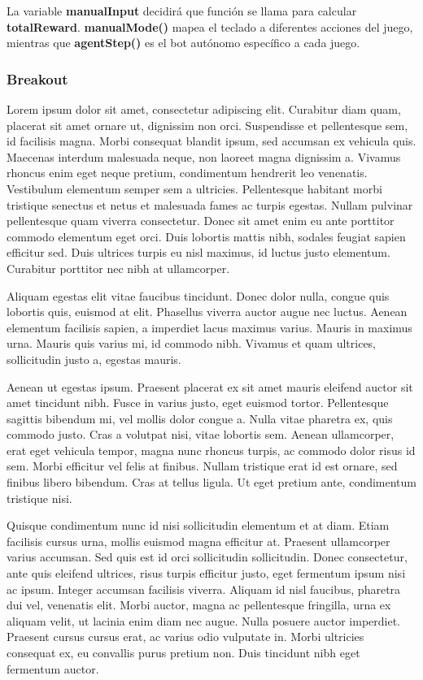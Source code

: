 La variable \textbf{manualInput} decidirá que función se llama para calcular \textbf{totalReward}. \textbf{manualMode()} mapea el teclado a diferentes acciones del juego, mientras que \textbf{agentStep()} es el bot autónomo específico a cada juego.

\subsubsection{Breakout}
\label{subsec:botsbasicos:breakout}
Lorem ipsum dolor sit amet, consectetur adipiscing elit. Curabitur diam quam, placerat sit amet ornare ut, dignissim non orci. Suspendisse et pellentesque sem, id facilisis magna. Morbi consequat blandit ipsum, sed accumsan ex vehicula quis. Maecenas interdum malesuada neque, non laoreet magna dignissim a. Vivamus rhoncus enim eget neque pretium, condimentum hendrerit leo venenatis. Vestibulum elementum semper sem a ultricies. Pellentesque habitant morbi tristique senectus et netus et malesuada fames ac turpis egestas. Nullam pulvinar pellentesque quam viverra consectetur. Donec sit amet enim eu ante porttitor commodo elementum eget orci. Duis lobortis mattis nibh, sodales feugiat sapien efficitur sed. Duis ultrices turpis eu nisl maximus, id luctus justo elementum. Curabitur porttitor nec nibh at ullamcorper.

Aliquam egestas elit vitae faucibus tincidunt. Donec dolor nulla, congue quis lobortis quis, euismod at elit. Phasellus viverra auctor augue nec luctus. Aenean elementum facilisis sapien, a imperdiet lacus maximus varius. Mauris in maximus urna. Mauris quis varius mi, id commodo nibh. Vivamus et quam ultrices, sollicitudin justo a, egestas mauris.

Aenean ut egestas ipsum. Praesent placerat ex sit amet mauris eleifend auctor sit amet tincidunt nibh. Fusce in varius justo, eget euismod tortor. Pellentesque sagittis bibendum mi, vel mollis dolor congue a. Nulla vitae pharetra ex, quis commodo justo. Cras a volutpat nisi, vitae lobortis sem. Aenean ullamcorper, erat eget vehicula tempor, magna nunc rhoncus turpis, ac commodo dolor risus id sem. Morbi efficitur vel felis at finibus. Nullam tristique erat id est ornare, sed finibus libero bibendum. Cras at tellus ligula. Ut eget pretium ante, condimentum tristique nisi.

Quisque condimentum nunc id nisi sollicitudin elementum et at diam. Etiam facilisis cursus urna, mollis euismod magna efficitur at. Praesent ullamcorper varius accumsan. Sed quis est id orci sollicitudin sollicitudin. Donec consectetur, ante quis eleifend ultrices, risus turpis efficitur justo, eget fermentum ipsum nisi ac ipsum. Integer accumsan facilisis viverra. Aliquam id nisl faucibus, pharetra dui vel, venenatis elit. Morbi auctor, magna ac pellentesque fringilla, urna ex aliquam velit, ut lacinia enim diam nec augue. Nulla posuere auctor imperdiet. Praesent cursus cursus erat, ac varius odio vulputate in. Morbi ultricies consequat ex, eu convallis purus pretium non. Duis tincidunt nibh eget fermentum auctor.


